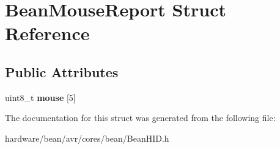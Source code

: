 \hypertarget{struct_bean_mouse_report}{}\section{Bean\+Mouse\+Report Struct Reference}
\label{struct_bean_mouse_report}
\subsection*{Public Attributes}
\begin{DoxyCompactItemize}
\item 
\hypertarget{struct_bean_mouse_report_ad0ec59ccb73842e189fbcc9277538c21}{}uint8\+\_\+t {\bfseries mouse} \mbox{[}5\mbox{]}\label{struct_bean_mouse_report_ad0ec59ccb73842e189fbcc9277538c21}

\end{DoxyCompactItemize}


The documentation for this struct was generated from the following file\+:\begin{DoxyCompactItemize}
\item 
hardware/bean/avr/cores/bean/Bean\+H\+I\+D.\+h\end{DoxyCompactItemize}
